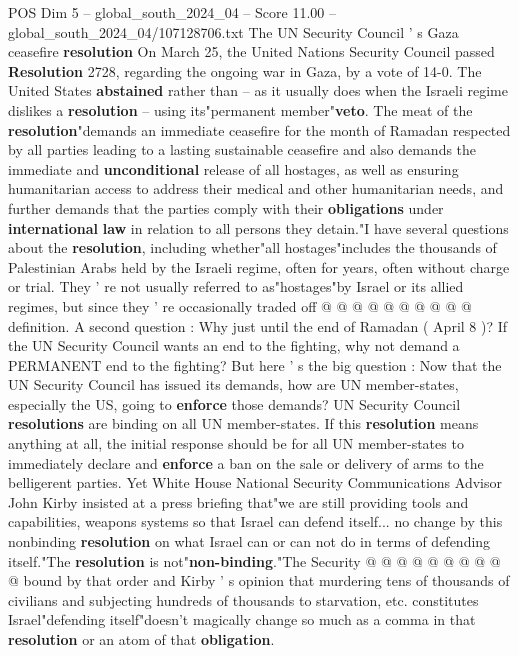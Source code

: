 \begin{textsample}{POS Dim 5 – global\_south\_2024\_04 – Score 11.00 – global\_south\_2024\_04/107128706.txt}  \label{ex:f5_pos_274}
The UN Security Council ' s Gaza ceasefire \textbf{resolution} On March 25, the United Nations Security Council passed \textbf{Resolution} 2728, regarding the ongoing war in Gaza, by a vote of 14-0.
The United States \textbf{abstained} rather than -- as it usually does when the Israeli regime dislikes a \textbf{resolution} -- using its"permanent member"\textbf{veto}.
The meat of the \textbf{resolution}"demands an immediate ceasefire for the month of Ramadan respected by all parties leading to a lasting sustainable ceasefire and also demands the immediate and \textbf{unconditional} release of all hostages, as well as ensuring humanitarian access to address their medical and other humanitarian needs, and further demands that the parties comply with their \textbf{obligations} under \textbf{international} \textbf{law} in relation to all persons they detain."I have several questions about the \textbf{resolution}, including whether"all hostages"includes the thousands of Palestinian Arabs held by the Israeli regime, often for years, often without charge or trial.
They ' re not usually referred to as"hostages"by Israel or its allied regimes, but since they ' re occasionally traded off @ @ @ @ @ @ @ @ @ @ definition.
A second question : Why just until the end of Ramadan ( April 8 )?
If the UN Security Council wants an end to the fighting, why not demand a PERMANENT end to the fighting?
But here ' s the big question : Now that the UN Security Council has issued its demands, how are UN member-states, especially the US, going to \textbf{enforce} those demands?
UN Security Council \textbf{resolutions} are binding on all UN member-states.
If this \textbf{resolution} means anything at all, the initial response should be for all UN member-states to immediately declare and \textbf{enforce} a ban on the sale or delivery of arms to the belligerent parties.
Yet White House National Security Communications Advisor John Kirby insisted at a press briefing that"we are still providing tools and capabilities, weapons systems so that Israel can defend itself... no change by this nonbinding \textbf{resolution} on what Israel can or can not do in terms of defending itself."The \textbf{resolution} is not"\textbf{non-binding}."The Security @ @ @ @ @ @ @ @ @ @ bound by that order and Kirby ' s opinion that murdering tens of thousands of civilians and subjecting hundreds of thousands to starvation, etc. constitutes Israel"defending itself"doesn't magically change so much as a comma in that \textbf{resolution} or an atom of that \textbf{obligation}.

\end{textsample}
